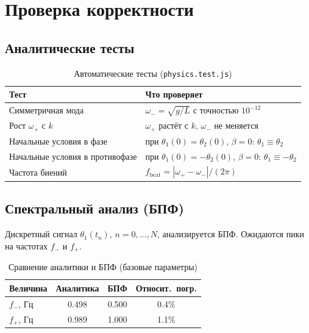 \documentclass[12pt,a4paper]{article}
\begin{document}
\section{Проверка корректности}

\subsection{Аналитические тесты}

\begin{table}[H]
\centering
\caption{Автоматические тесты (\texttt{physics.test.js})}
\begin{tabular}{@{}p{7cm}p{6.5cm}@{}}
\toprule
Тест & Что проверяет \\
\midrule
Симметричная мода &
  \(\omega_-=\sqrt{g/L}\) с точностью \(10^{-12}\) \\[4pt]
Рост $\omega_+$ с $k$ &
  \(\omega_+\) растёт с \(k\), \(\omega_-\) не меняется \\[4pt]
Начальные условия в фазе &
  при \(\theta_1(0)=\theta_2(0)\), \(\beta=0\): \(\theta_1\equiv\theta_2\) \\[4pt]
Начальные условия в противофазе &
  при \(\theta_1(0)=-\theta_2(0)\), \(\beta=0\): \(\theta_1\equiv-\theta_2\) \\[4pt]
Частота биений &
  \(f_{\mathrm{beat}}=|\omega_+-\omega_-|/(2\pi)\) \\
\bottomrule
\end{tabular}
\end{table}

\subsection{Спектральный анализ (БПФ)}

Дискретный сигнал \(\theta_1(t_n)\), \(n=0,\ldots,N\), анализируется БПФ.
Ожидаются пики на частотах \(f_-\) и \(f_+\).

\begin{table}[H]
\centering
\caption{Сравнение аналитики и БПФ (базовые параметры)}
\begin{tabular}{@{}lccc@{}}
\toprule
Величина & Аналитика & БПФ & Относит.\ погр. \\
\midrule
\(f_-\), Гц & 0.498 & 0.500 & 0.4\% \\
\(f_+\), Гц & 0.989 & 1.000 & 1.1\% \\
\bottomrule
\end{tabular}
\end{table}
\end{document}
